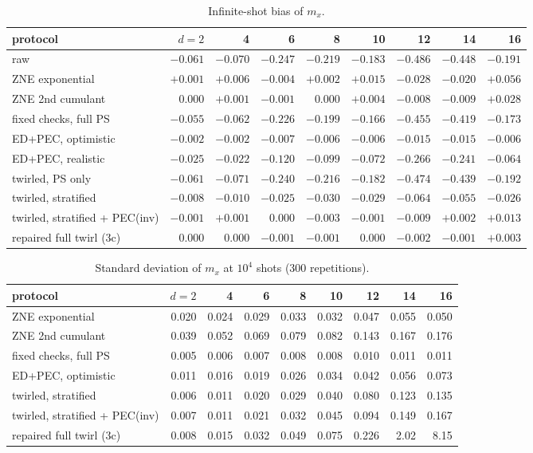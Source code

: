 \documentclass[11pt,a4paper]{article}
\theoremstyle{remark}
\begin{document}
\begin{table}[h]
\centering\small
\caption{Infinite-shot bias of $m_x$.}
\label{tab:bias}
\setlength{\tabcolsep}{4pt}
\begin{tabular}{lrrrrrrrr}
\toprule
protocol & $d{=}2$ & 4 & 6 & 8 & 10 & 12 & 14 & 16 \\
\midrule
raw & $-0.061$ & $-0.070$ & $-0.247$ & $-0.219$ & $-0.183$ & $-0.486$ & $-0.448$ & $-0.191$ \\
ZNE exponential & $+0.001$ & $+0.006$ & $-0.004$ & $+0.002$ & $+0.015$ & $-0.028$ & $-0.020$ & $+0.056$ \\
ZNE 2nd cumulant & $0.000$ & $+0.001$ & $-0.001$ & $0.000$ & $+0.004$ & $-0.008$ & $-0.009$ & $+0.028$ \\
fixed checks, full PS & $-0.055$ & $-0.062$ & $-0.226$ & $-0.199$ & $-0.166$ & $-0.455$ & $-0.419$ & $-0.173$ \\
ED+PEC, optimistic & $-0.002$ & $-0.002$ & $-0.007$ & $-0.006$ & $-0.006$ & $-0.015$ & $-0.015$ & $-0.006$ \\
ED+PEC, realistic & $-0.025$ & $-0.022$ & $-0.120$ & $-0.099$ & $-0.072$ & $-0.266$ & $-0.241$ & $-0.064$ \\
twirled, PS only & $-0.061$ & $-0.071$ & $-0.240$ & $-0.216$ & $-0.182$ & $-0.474$ & $-0.439$ & $-0.192$ \\
twirled, stratified & $-0.008$ & $-0.010$ & $-0.025$ & $-0.030$ & $-0.029$ & $-0.064$ & $-0.055$ & $-0.026$ \\
twirled, stratified + PEC(inv) & $-0.001$ & $+0.001$ & $0.000$ & $-0.003$ & $-0.001$ & $-0.009$ & $+0.002$ & $+0.013$ \\
repaired full twirl (3c) & $0.000$ & $0.000$ & $-0.001$ & $-0.001$ & $0.000$ & $-0.002$ & $-0.001$ & $+0.003$ \\
\bottomrule
\end{tabular}
\end{table}

\begin{table}[h]
\centering\small
\caption{Standard deviation of $m_x$ at $10^4$ shots (300 repetitions).}
\label{tab:std}
\begin{tabular}{lrrrrrrrr}
\toprule
protocol & $d{=}2$ & 4 & 6 & 8 & 10 & 12 & 14 & 16 \\
\midrule
ZNE exponential & 0.020 & 0.024 & 0.029 & 0.033 & 0.032 & 0.047 & 0.055 & 0.050 \\
ZNE 2nd cumulant & 0.039 & 0.052 & 0.069 & 0.079 & 0.082 & 0.143 & 0.167 & 0.176 \\
fixed checks, full PS & 0.005 & 0.006 & 0.007 & 0.008 & 0.008 & 0.010 & 0.011 & 0.011 \\
ED+PEC, optimistic & 0.011 & 0.016 & 0.019 & 0.026 & 0.034 & 0.042 & 0.056 & 0.073 \\
twirled, stratified & 0.006 & 0.011 & 0.020 & 0.029 & 0.040 & 0.080 & 0.123 & 0.135 \\
twirled, stratified + PEC(inv) & 0.007 & 0.011 & 0.021 & 0.032 & 0.045 & 0.094 & 0.149 & 0.167 \\
repaired full twirl (3c) & 0.008 & 0.015 & 0.032 & 0.049 & 0.075 & 0.226 & 2.02 & 8.15 \\
\bottomrule
\end{tabular}
\end{table}
\end{document}
